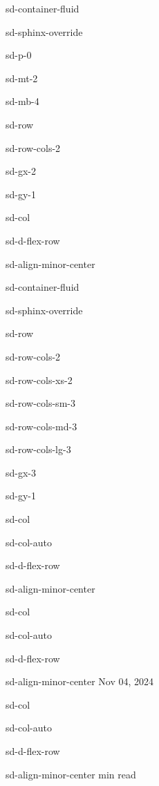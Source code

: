 \documentclass[letterpaper,10pt,english]{jupyterBook}
\begin{document}
\begin{sphinxuseclass}{sd-container-fluid}
\begin{sphinxuseclass}{sd-sphinx-override}
\begin{sphinxuseclass}{sd-p-0}
\begin{sphinxuseclass}{sd-mt-2}
\begin{sphinxuseclass}{sd-mb-4}
\begin{sphinxuseclass}{sd-row}
\begin{sphinxuseclass}{sd-row-cols-2}
\begin{sphinxuseclass}{sd-gx-2}
\begin{sphinxuseclass}{sd-gy-1}
\begin{sphinxuseclass}{sd-col}
\begin{sphinxuseclass}{sd-d-flex-row}
\begin{sphinxuseclass}{sd-align-minor-center}
\begin{sphinxuseclass}{sd-container-fluid}
\begin{sphinxuseclass}{sd-sphinx-override}
\begin{sphinxuseclass}{sd-row}
\begin{sphinxuseclass}{sd-row-cols-2}
\begin{sphinxuseclass}{sd-row-cols-xs-2}
\begin{sphinxuseclass}{sd-row-cols-sm-3}
\begin{sphinxuseclass}{sd-row-cols-md-3}
\begin{sphinxuseclass}{sd-row-cols-lg-3}
\begin{sphinxuseclass}{sd-gx-3}
\begin{sphinxuseclass}{sd-gy-1}
\begin{sphinxuseclass}{sd-col}
\begin{sphinxuseclass}{sd-col-auto}
\begin{sphinxuseclass}{sd-d-flex-row}
\begin{sphinxuseclass}{sd-align-minor-center}
\end{sphinxuseclass}
\end{sphinxuseclass}
\end{sphinxuseclass}
\end{sphinxuseclass}
\begin{sphinxuseclass}{sd-col}
\begin{sphinxuseclass}{sd-col-auto}
\begin{sphinxuseclass}{sd-d-flex-row}
\begin{sphinxuseclass}{sd-align-minor-center}
\sphinxAtStartPar
Nov 04, 2024

\end{sphinxuseclass}
\end{sphinxuseclass}
\end{sphinxuseclass}
\end{sphinxuseclass}
\begin{sphinxuseclass}{sd-col}
\begin{sphinxuseclass}{sd-col-auto}
\begin{sphinxuseclass}{sd-d-flex-row}
\begin{sphinxuseclass}{sd-align-minor-center}
 min read


\end{sphinxuseclass}
\end{sphinxuseclass}
\end{sphinxuseclass}
\end{sphinxuseclass}
\end{sphinxuseclass}
\end{sphinxuseclass}
\end{sphinxuseclass}
\end{sphinxuseclass}
\end{sphinxuseclass}
\end{sphinxuseclass}
\end{sphinxuseclass}
\end{sphinxuseclass}
\end{sphinxuseclass}
\end{sphinxuseclass}
\end{sphinxuseclass}
\end{sphinxuseclass}
\end{sphinxuseclass}
\end{sphinxuseclass}
\end{sphinxuseclass}
\end{sphinxuseclass}
\end{sphinxuseclass}
\end{sphinxuseclass}
\end{sphinxuseclass}
\end{sphinxuseclass}
\end{sphinxuseclass}
\end{sphinxuseclass}
\end{document}
